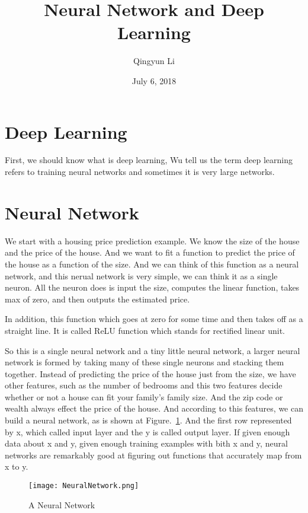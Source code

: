 \documentclass{article}
\author{Qingyun Li}
\date{July 6, 2018}
\title{Neural Network and Deep Learning}
\begin{document}
\maketitle
\section{Deep Learning} 
 \par First, we should know what is deep learning, Wu tell us the term deep learning refers to training neural networks and sometimes it is very large networks.
\section{Neural Network}
\par We start with a housing price prediction example. We know the size of the house and the price of the house. And we want to fit a function to predict the price of the house as a function of the size. And we can think of this function as a neural network, and this nerual network is very simple, we can think it as a single neuron. All the neuron does is input the size, computes the linear function, takes max of zero, and then outputs the estimated price. 
 \par In addition, this function which goes at zero for some time and then takes off as a straight line. It is called ReLU function which stands for rectified linear unit.
 \par So this is a single neural network and a tiny little neural network, a larger neural network is formed by taking many of these single neurons and stacking them together. Instead of predicting the price of the house just from the size, we have other features, such as the number of bedrooms and this two features decide whether or not a house can fit your family's family size. And the zip code or wealth always effect the price of the house. And according to this features, we can build a neural network, as is shown at Figure.~\ref{network}. And the first row represented by x, which called input layer and the y is called output layer. If given enough data about x and y, given enough training examples with bith x and y, neural networks are remarkably good at figuring out functions that accurately map from x to y.
\begin{figure}[htbp]
 \centering
 \texttt{[image: NeuralNetwork.png]}
 \caption{A Neural Network}
 \label{network}
\end{figure}
\end{document}
